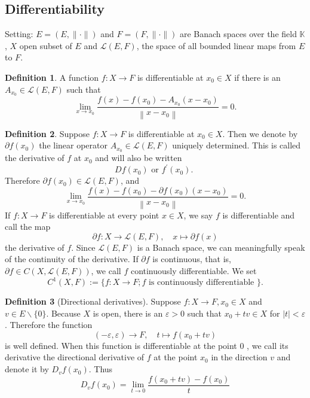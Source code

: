 \documentclass[12pt,a4paper]{book}
\theoremstyle{definition}
\newtheorem{defn}{Definition}[section]
\begin{document}
\subsection{Differentiability}
Setting: 
$E=(E,\|\cdot\|)$ and $F=(F,\|\cdot\|)$ are Banach spaces
over the field $\mathbb{K}$, $X$ open subset of $E$ and 
$\mathcal{L}(E, F)$, the space of all bounded linear maps from $E$ to $F$.
\begin{defn}
    A function $f: X \rightarrow F$ is differentiable at $x_0 \in X$ if there is an $A_{x_0} \in \mathcal{L}(E, F)$ such that
    $$
    \lim _{x \rightarrow x_0} \frac{f(x)-f\left(x_0\right)-A_{x_0}\left(x-x_0\right)}{\left\|x-x_0\right\|}=0 .
    $$
\end{defn}
\begin{defn}
    Suppose $f: X \rightarrow F$ is differentiable at $x_0 \in X$. Then we denote by $\partial f\left(x_0\right)$ the linear operator $A_{x_0} \in \mathcal{L}(E, F)$ uniquely determined. 
    This is called the derivative of $f$ at $x_0$ and will also be written
    $$
    D f\left(x_0\right) \text { or } f^{\prime}\left(x_0\right) \text {. }
    $$
    Therefore $\partial f\left(x_0\right) \in \mathcal{L}(E, F)$, and
    $$
    \lim _{x \rightarrow x_0} \frac{f(x)-f\left(x_0\right)-\partial f\left(x_0\right)\left(x-x_0\right)}{\left\|x-x_0\right\|}=0 .
    $$
    If $f: X \rightarrow F$ is differentiable at every point $x \in X$, we say $f$ is differentiable and call the map
    $$
    \partial f: X \rightarrow \mathcal{L}(E, F), \quad x \mapsto \partial f(x)
    $$
    the derivative of $f$.
    Since $\mathcal{L}(E, F)$ is a Banach space, we can meaningfully speak of the continuity of the derivative. If $\partial f$ is continuous, that is, $\partial f \in C(X, \mathcal{L}(E, F))$, we call $f$ continuously differentiable. We set
    $$
    C^1(X, F):=\{f: X \rightarrow F ; f \text { is continuously differentiable }\} .
    $$
\end{defn}
\begin{defn}[Directional derivatives]
    Suppose $f: X \rightarrow F, x_0 \in X$ and $v \in E \backslash\{0\}$. Because $X$ is open, there is an $\varepsilon>0$ such that $x_0+t v \in X$ for $|t|<\varepsilon$. Therefore the function
    $$
    (-\varepsilon, \varepsilon) \rightarrow F, \quad t \mapsto f\left(x_0+t v\right)
    $$
    is well defined. When this function is differentiable at the point 0 , we call its derivative the directional derivative of $f$ at the point $x_0$ in the direction $v$ and denote it by $D_v f\left(x_0\right)$. Thus
    $$
    D_v f\left(x_0\right)=\lim _{t \rightarrow 0} \frac{f\left(x_0+t v\right)-f\left(x_0\right)}{t}
    $$
\end{defn}
\end{document}
